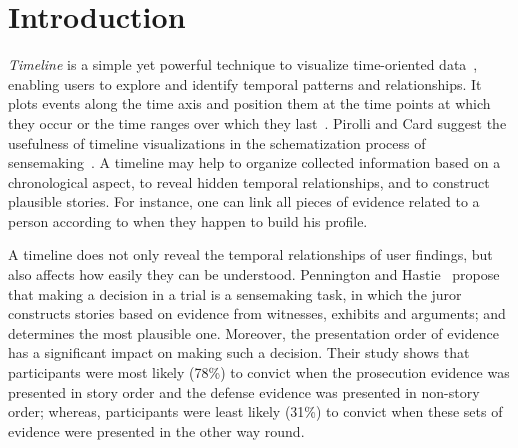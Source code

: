 \section{Introduction}


\emph{Timeline} is a simple yet powerful technique to visualize time-oriented data~\cite{Tufte1983}, enabling users to explore and identify temporal patterns and relationships. It plots events along the time axis and position them at the time points at which they occur or the time ranges over which they last~\cite{Plaisant1996}. Pirolli and Card suggest the usefulness of timeline visualizations in the schematization process of sensemaking~\cite{Pirolli2005}. A timeline may help to organize collected information based on a chronological aspect, to reveal hidden temporal relationships, and to construct plausible stories. For instance, one can link all pieces of evidence related to a person according to when they happen to build his profile. 

A timeline does not only reveal the temporal relationships of user findings, but also affects how easily they can be understood. Pennington and Hastie~\cite{Pennington1991} propose that making a decision in a trial is a sensemaking task, in which the juror constructs stories based on evidence from witnesses, exhibits and arguments; and determines the most plausible one. Moreover, the presentation order of evidence has a significant impact on making such a decision. Their study shows that participants were most likely (78\%) to convict when the prosecution evidence was presented in story order and the defense evidence was presented in non-story order; whereas, participants were least likely (31\%) to convict when these sets of evidence were presented in the other way round.

